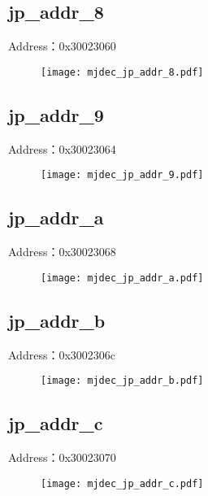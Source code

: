 \subsection{jp\_addr\_8}
\label{mjdec-jp-addr-8}
Address：0x30023060
 \begin{figure}[H]
\texttt{[image: mjdec\_jp\_addr\_8.pdf]}
\end{figure}

\subsection{jp\_addr\_9}
\label{mjdec-jp-addr-9}
Address：0x30023064
 \begin{figure}[H]
\texttt{[image: mjdec\_jp\_addr\_9.pdf]}
\end{figure}

\subsection{jp\_addr\_a}
\label{mjdec-jp-addr-a}
Address：0x30023068
 \begin{figure}[H]
\texttt{[image: mjdec\_jp\_addr\_a.pdf]}
\end{figure}

\subsection{jp\_addr\_b}
\label{mjdec-jp-addr-b}
Address：0x3002306c
 \begin{figure}[H]
\texttt{[image: mjdec\_jp\_addr\_b.pdf]}
\end{figure}

\subsection{jp\_addr\_c}
\label{mjdec-jp-addr-c}
Address：0x30023070
 \begin{figure}[H]
\texttt{[image: mjdec\_jp\_addr\_c.pdf]}
\end{figure}

